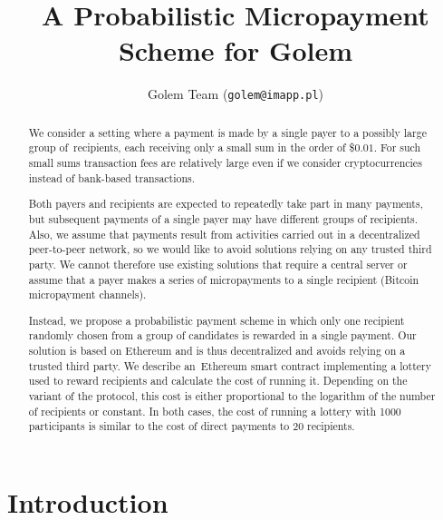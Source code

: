 \documentclass[a4paper]{article}
\title{A Probabilistic Micropayment Scheme for Golem}
\author{Golem Team (\texttt{golem@imapp.pl})}
\begin{document}
\maketitle

\begin{abstract}
    We consider a setting where a payment is made by a single payer
    to a possibly large group of~recipients, each receiving only a small
    sum in the order of \$$0.01$. For such small sums transaction fees are
    relatively large even if we consider cryptocurrencies instead of
    bank-based transactions.

    Both payers and recipients are expected to repeatedly take part in
    many payments, but subsequent payments of a single payer may
    have different groups of recipients. Also, we
    assume that payments result from activities carried out in a
    decentralized peer-to-peer network, so we would like to avoid
    solutions relying on any trusted third party. We cannot therefore use
    existing solutions that require a central server or assume that a
    payer makes a series of micropayments to a single recipient (Bitcoin
    micropayment channels).

    Instead, we propose a probabilistic payment scheme in which only one
    recipient randomly chosen from a group of candidates is rewarded in
    a single payment. Our solution is based on Ethereum and is thus
    decentralized and avoids relying on a trusted third party. We describe
    an~Ethereum smart contract implementing a lottery used to reward
    recipients and calculate the cost of running it. Depending on the
    variant of the protocol, this cost is either proportional to the
    logarithm of the number of recipients or constant. In both cases,
    the cost of running a lottery with 1000 participants is similar
    to the cost of direct payments to 20 recipients.
\end{abstract}

\section{Introduction}
\end{document}
